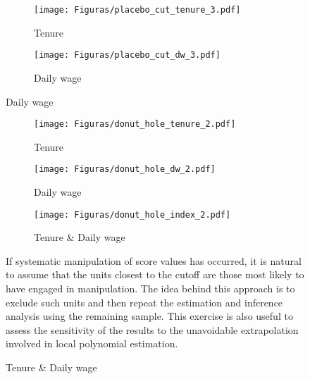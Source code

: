 \begin{figure}[H]
     \caption{Estimation for artificial cutoffs (Calculator + letter treatment)}
    \label{placebo_cutoff_t3}
\begin{center}
\begin{subfigure}{0.475\textwidth}
\caption{Tenure}
        \texttt{[image: Figuras/placebo\_cut\_tenure\_3.pdf]}
    \end{subfigure}
    \begin{subfigure}{0.475\textwidth}
\caption{Daily wage}
        \texttt{[image: Figuras/placebo\_cut\_dw\_3.pdf]}
    \end{subfigure}
  \end{center}
  
    \scriptsize 
\end{figure}




\begin{figure}[H]
     \caption{Donut-hole sensitivity (Calculator treatment)}
    \label{donut_hole_t2}
\begin{center}
\begin{subfigure}{0.475\textwidth}
\caption{Tenure}
        \texttt{[image: Figuras/donut\_hole\_tenure\_2.pdf]}
    \end{subfigure}
    \begin{subfigure}{0.475\textwidth}
\caption{Daily wage}
        \texttt{[image: Figuras/donut\_hole\_dw\_2.pdf]}
    \end{subfigure}
    \begin{subfigure}{0.475\textwidth}
\caption{Tenure \& Daily wage}
        \texttt{[image: Figuras/donut\_hole\_index\_2.pdf]}
    \end{subfigure}    
  \end{center}
  
    \scriptsize  If systematic manipulation of score values has occurred, it is natural to assume that the units closest to the cutoff are those most likely to have engaged in manipulation. The idea behind this approach is to exclude such units and then repeat the estimation and inference analysis using the remaining sample. This exercise is also useful to assess the sensitivity of the results to the unavoidable extrapolation involved in local polynomial estimation.
\end{figure}


